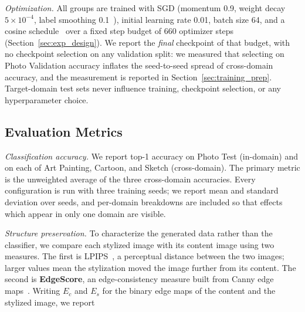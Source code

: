 \textit{Optimization.} All groups are trained with SGD (momentum 0.9, weight decay $5\times10^{-4}$, label smoothing 0.1~\cite{szegedy2016rethinking}), initial learning rate 0.01, batch size 64, and a cosine schedule~\cite{loshchilov2017sgdr} over a fixed step budget of 660 optimizer steps (Section~\ref{sec:exp_design}). We report the \textit{final} checkpoint of that budget, with no checkpoint selection on any validation split: we measured that selecting on Photo Validation accuracy inflates the seed-to-seed spread of cross-domain accuracy, and the measurement is reported in Section~\ref{sec:training_prep}. Target-domain test sets never influence training, checkpoint selection, or any hyperparameter choice.



\subsection{Evaluation Metrics}
\label{sec:evaluation_metrics}

\textit{Classification accuracy.} We report top-1 accuracy on Photo Test (in-domain) and on each of Art Painting, Cartoon, and Sketch (cross-domain). The primary metric is the unweighted average of the three cross-domain accuracies. Every configuration is run with three training seeds; we report mean and standard deviation over seeds, and per-domain breakdowns are included so that effects which appear in only one domain are visible.

\textit{Structure preservation.} To characterize the generated data rather than the classifier, we compare each stylized image with its content image using two measures. The first is LPIPS~\cite{zhang2018lpips}, a perceptual distance between the two images; larger values mean the stylization moved the image further from its content. The second is \textbf{EdgeScore}, an edge-consistency measure built from Canny edge maps~\cite{canny1986}. Writing $E_c$ and $E_s$ for the binary edge maps of the content and the stylized image, we report

